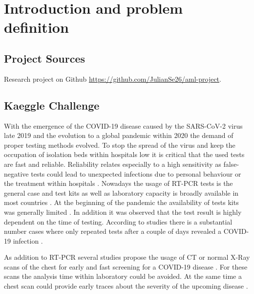 

\chapter{Introduction and problem definition}\label{chapter:intro}

\section*{Project Sources}
Research project on Github \url{https://github.com/JulianSe26/aml-project}.

\section{Kaeggle Challenge}
With the emergence of the COVID-19 disease caused by the SARS-CoV-2 virus late 2019 \autocite{huang2020clinical} and the evolution to a global pandemic within 2020 the demand of proper testing methods evolved. To stop the spread of the virus and keep the occupation of isolation beds within hospitals low it is critical that the used tests are fast and reliable. Reliability relates especially to a high sensitivity as false-negative tests could lead to unexpected infections due to personal behaviour or the treatment within hospitals \autocite{west2020covid}. Nowadays the usage of \ac{RT-PCR} tests is the general case and test kits as well as laboratory capacity is broadly available in most countries \autocite{vankasteren2020104412}. At the beginning of the pandemic the availability of tests kits was generally limited \autocite{Tannem1090}. In addition it was observed that the test result is highly dependent on the time of testing. According to studies there is a substantial number cases where only repeated tests after a couple of days revealed a COVID-19 infection \autocite{arevalo2020false}.

As addition to \ac{RT-PCR} several studies propose the usage of \ac{CT} or normal X-Ray scans of the chest for early and fast screening for a COVID-19 disease \autocite{fang2020sensitivity,xie2020chest}. For these scans the analysis time within laboratory could be avoided. At the same time a chest scan could provide early traces about the severity of the upcoming disease \autocite{yasin2020chest}. 

